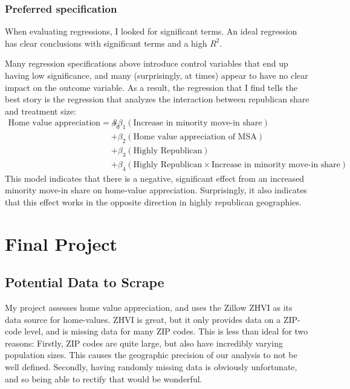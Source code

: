 \documentclass[11pt]{article}
\begin{document}
    \subsubsection{Preferred specification}\label{preferred-specification}

When evaluating regressions, I looked for significant terms. An ideal regression has clear conclusions with significant terms and a high \(R^2\).

Many regression specifications above introduce control variables that
end up having low significance, and many (surprisingly, at times) appear
to have no clear impact on the outcome variable. As a result, the
regression that I find tells the best story is the regression that
analyzes the interaction between republican share and treatment size:
\begin{align*}
\text{Home value appreciation}=\beta_0&+\beta_1(\text{Increase in minority move-in share})\\
&+\beta_2(\text{Home value appreciation of MSA})\\
&+\beta_3(\text{Highly Republican})\\
&+\beta_4(\text{Highly Republican} \times \text{Increase in minority move-in share})
\end{align*} 
This model indicates that there is a negative,
significant effect from an increased minority move-in share on
home-value appreciation. Surprisingly, it also indicates that this
effect works in the opposite direction in highly republican geographies.

    \section{Final Project}\label{final-project}

    \subsection{Potential Data to Scrape}\label{potential-data-to-scrape}

    My project assesses home value appreciation, and uses the Zillow ZHVI as
its data source for home-values. ZHVI is great, but it only provides
data on a ZIP-code level, and is missing data for many ZIP codes. This
is less than ideal for two reasons: Firstly, ZIP codes are quite large,
but also have incredibly varying population sizes. This causes the
geographic precision of our analysis to not be well defined. Secondly,
having randomly missing data is obviously unfortunate, and so being able
to rectify that would be wonderful.
\end{document}

